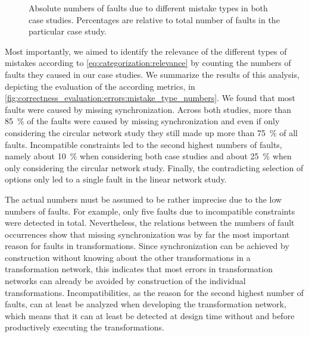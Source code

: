 

\begin{figure}
    
    \caption[Number of occurrences of mistake types]{Absolute numbers of faults due to different mistake types in both case studies. Percentages are relative to total number of faults in the particular case study.}
    \label{fig:correctness_evaluation:errors:mistake_type_numbers}
\end{figure}

Most importantly, we aimed to identify the relevance of the different types of mistakes according to \autoref{eq:categorization:relevance} by counting the numbers of faults they caused in our case studies.
We summarize the results of this analysis, depicting the evaluation of the according metrics, in \autoref{fig:correctness_evaluation:errors:mistake_type_numbers}.
We found that most faults were caused by missing synchronization.
Across both studies, more than \SI{85}{\percent} of the faults were caused by missing synchronization and even if only considering the circular network study they still made up more than \SI{75}{\percent} of all faults.
Incompatible constraints led to the second highest numbers of faults, namely about \SI{10}{\percent} when considering both case studies and about \SI{25}{\percent} when only considering the circular network study.
Finally, the contradicting selection of options only led to a single fault in the linear network study.

The actual numbers must be assumed to be rather imprecise due to the low numbers of faults.
For example, only five faults due to incompatible constraints were detected in total.
Nevertheless, the relations between the numbers of fault occurrences show that missing synchronization was by far the most important reason for faults in transformations.
Since synchronization can be achieved by construction without knowing about the other transformations in a transformation network, this indicates that most errors in transformation networks can already be avoided by construction of the individual transformations.
Incompatibilities, as the reason for the second highest number of faults, can at least be analyzed when developing the transformation network, which means that it can at least be detected at design time without and before productively executing the transformations.

